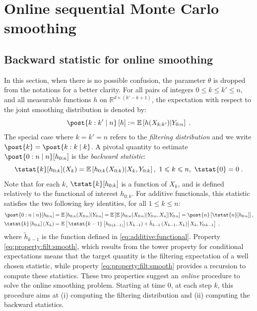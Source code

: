 \documentclass[12pt]{article}
\newcommand{\parvec}{\theta}
\newcommand{\af}[1]{h_{#1}}
\newcommand{\addf}[1]{\termletter_{#1}}
\newcommand{\termletter}{\tilde{h}}
\def\pE{\mathbb{E}}
\newcommand{\rset}{\ensuremath{\mathbb{R}}}
\newcommand{\eqsp}{\;}
\begin{document}
\section{Online sequential Monte Carlo smoothing}
\label{sec:method}

\subsection{Backward statistic for online smoothing}

In this section, when there is no possible confusion, the parameter $\parvec$ is dropped from the notations for a better clarity. For all pairs of integers $0\leqslant k \leqslant k' \leqslant n$, and all measurable functions $h$ on $\rset^{d \times (k' - k + 1)}$, the expectation with respect to the joint smoothing distribution is denoted by:
$$
\post{k:k' \mid n} \left[ h \right] := \pE\left[ h(X_{k:k'}) \middle | Y_{0:n} \right]\eqsp .
$$
The special case where $k = k' = n$ refers to the \textit{filtering distribution} and we write $\post{k} = \post{k:k \mid k}$.
A pivotal quantity to estimate $\post{0:n \mid n}[\af{0:n}]$ is the \textit{backward statistic}:
\begin{equation}
\label{eq:T:stat}
\tstat{k}[\af{0:k}](X_k) = \pE \left[\af{0:k}(X_{0:k        }) \middle | X_k, Y_{0:k}\right],~1\leqslant k \leqslant n,~\tstat{0} = 0\eqsp.
\end{equation}
Note that for each $k$, $\tstat{k}[\af{0:k}]$ is a function of $X_k$, and is defined relatively to the functional of interest $\af{0:k}$.
For additive functionals, this statistic satisfies the two following key identities, for all $1\leqslant k \leqslant n$:
\begin{align}
\post{0:n \mid n}[\af{0:n}] &= \pE\left[\af{0:n}(X_{0:n})\middle| Y_{0:n}\right] = \pE\left[\pE\left[\af{0:n}(X_{0:n})\middle|Y_{0:n},X_n\right]\middle| Y_{0:n}\right] = \post{n}\left[\tstat{n}[\af{0:n}] \right], \label{eq:property:filt:smooth}\\
\tstat{k}\left[\af{0:k}\right](X_{k}) &= \pE\left[\left.\tstat{k-1}\left[\af{0:(k-1)}\right]\left(X_{k-1}\right) + \addf{k-1}\left(X_{k-1},X_{k}\right)\right|X_{k},Y_{0:k-1} \right]\eqsp, \label{eq:property:backward}
\end{align} 
where $\addf{k-1}$ is the function defined in \eqref{eq:additive:functional}.
 Property \eqref{eq:property:filt:smooth}, which results from the tower property for conditional expectations means that the target quantity is the filtering expectation of a well chosen statistic, while property \eqref{eq:property:filt:smooth} provides a recursion to compute these statistics.  These two properties suggest an \textit{online} procedure to solve the online smoothing problem. Starting at time 0, at each step $k$, this procedure aims at (i) computing the filtering distribution and (ii) computing the backward statistics. 
\end{document}
